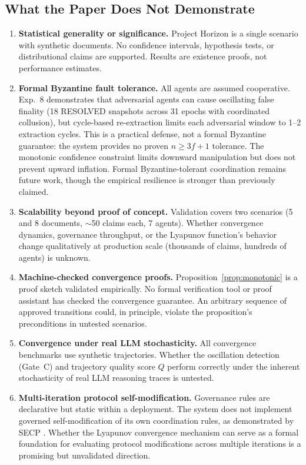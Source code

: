\documentclass[11pt]{article}
\begin{document}
\subsection{What the Paper Does Not Demonstrate}

\begin{enumerate}
  \item \textbf{Statistical generality or significance.} Project Horizon is a single scenario with synthetic documents. No confidence intervals, hypothesis tests, or distributional claims are supported. Results are existence proofs, not performance estimates.
  \item \textbf{Formal Byzantine fault tolerance.} All agents are assumed cooperative. Exp.~8 demonstrates that adversarial agents can cause oscillating false finality (18 RESOLVED snapshots across 31 epochs with coordinated collusion), but cycle-based re-extraction limits each adversarial window to 1--2 extraction cycles. This is a practical defense, not a formal Byzantine guarantee: the system provides no proven $n \geq 3f+1$ tolerance. The monotonic confidence constraint limits downward manipulation but does not prevent upward inflation. Formal Byzantine-tolerant coordination \cite{lamport1982,castro1999,zheng2025} remains future work, though the empirical resilience is stronger than previously claimed.
  \item \textbf{Scalability beyond proof of concept.} Validation covers two scenarios (5 and 8 documents, $\sim$50 claims each, 7 agents). Whether convergence dynamics, governance throughput, or the Lyapunov function's behavior change qualitatively at production scale (thousands of claims, hundreds of agents) is unknown.
  \item \textbf{Machine-checked convergence proofs.} Proposition~\ref{prop:monotonic} is a proof sketch validated empirically. No formal verification tool or proof assistant has checked the convergence guarantee. An arbitrary sequence of approved transitions could, in principle, violate the proposition's preconditions in untested scenarios.
  \item \textbf{Convergence under real LLM stochasticity.} All convergence benchmarks use synthetic trajectories. Whether the oscillation detection (Gate~C) and trajectory quality score $Q$ perform correctly under the inherent stochasticity of real LLM reasoning traces is untested.
  \item \textbf{Multi-iteration protocol self-modification.} Governance rules are declarative but static within a deployment. The system does not implement governed self-modification of its own coordination rules, as demonstrated by SECP \cite{delachica2026}. Whether the Lyapunov convergence mechanism can serve as a formal foundation for evaluating protocol modifications across multiple iterations is a promising but unvalidated direction.

\end{enumerate}
\end{document}
